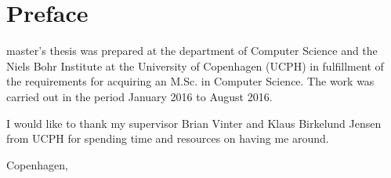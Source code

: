\chapter{Preface}

 master's thesis was prepared at the department of Computer Science and the Niels Bohr Institute at the University of Copenhagen (UCPH) in fulfillment of the requirements for acquiring an M.Sc. in Computer Science. The work was carried out in the period January 2016 to August 2016.
\newline

I would like to thank my supervisor Brian Vinter and Klaus Birkelund Jensen from UCPH for spending time and resources on having me around.

\vspace{10mm}
\begin{center}
	\hspace{20mm} Copenhagen, \HandinDate 
	\vspace{5mm}
	\newline
\end{center}
\begin{flushright}
	\FullName
\end{flushright}